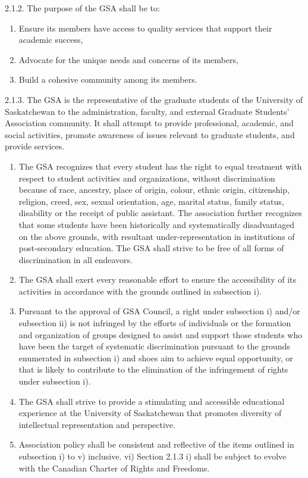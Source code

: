 \documentclass{article}
\begin{document}
2.1.2. The purpose of the GSA shall be to: 
\begin{enumerate}[i]
\item Ensure its members have access to quality services that support their academic success, 
\item Advocate for the unique needs and concerns of its members, 
\item Build a cohesive community among its members. 
\end{enumerate}

2.1.3. The GSA is the representative of the graduate students of the University of Saskatchewan to the administration, faculty, and external Graduate Students’ Association community. It shall attempt to provide professional, academic, and social activities, promote awareness of issues relevant to graduate students, and provide services. 
\begin{enumerate}[i]
\item The GSA recognizes that every student has the right to equal treatment with respect to student activities and organizations, without discrimination because of race, ancestry, place of origin, colour, ethnic origin, citizenship, religion, creed, sex, sexual orientation, age, marital status, family status, disability or the receipt of public assistant. The association further recognizes that some students have been historically and systematically disadvantaged on the above grounds, with resultant under-representation in institutions of post-secondary 
education. The GSA shall strive to be free of all forms of discrimination in all endeavors. 
\item The GSA shall exert every reasonable effort to ensure the accessibility 
of its activities in accordance with the grounds outlined in subsection i). 
\item Pursuant to the approval of GSA Council, a right under subsection i) and/or subsection ii) is not infringed by the efforts of individuals or the formation and organization of groups designed to assist and support those students who have been the target of systematic discrimination pursuant to the grounds enumerated in subsection i) and shoes aim to achieve equal opportunity, or that is likely to contribute to the elimination of the infringement of rights under subsection i). 
\item The GSA shall strive to provide a stimulating and accessible educational experience at the University of Saskatchewan that promotes diversity of intellectual representation and perspective. 
\item Association policy shall be consistent and reflective of the items outlined in subsection i) to v) inclusive. 
vi) Section 2.1.3 i) shall be subject to evolve with the Canadian Charter of 
Rights and Freedoms. 
\end{enumerate}
\end{document}
